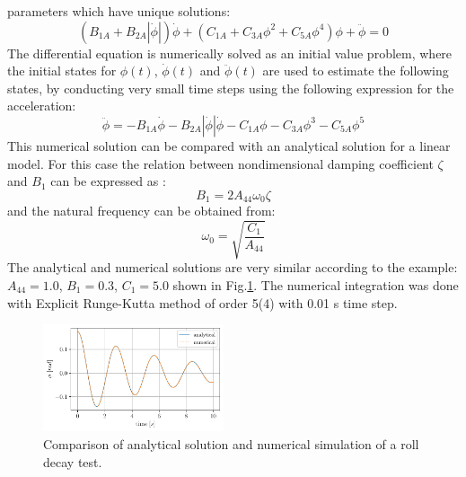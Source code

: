 parameters which have unique solutions:
\begin{equation}
\left(B_{1A} + B_{2A} \left|{\dot{\phi}}\right|\right) \dot{\phi} + \left(C_{1A} + C_{3A} \phi^{2} + C_{5A} \phi^{4}\right) \phi + \ddot{\phi} = 0
\label{eq:roll_decay_equation_quadratic_A}
\end{equation}
The differential equation is numerically solved as an initial value
problem, where the initial states for $\phi(t)$, $\dot{\phi}(t)$ and
$\ddot{\phi}(t)$ are used to estimate the following states, by
conducting very small time steps using the following expression for the
acceleration:
\begin{equation}
\ddot{\phi} = - B_{1A} \dot{\phi} - B_{2A} \left|{\dot{\phi}}\right| \dot{\phi} - C_{1A} \phi - C_{3A} \phi^{3} - C_{5A} \phi^{5}
\label{eq:eq_phi1d}
\end{equation}
This numerical solution can be compared with an analytical solution
\citep{7505983/KL7A3RIV} for a linear model.
For this
case the relation between nondimensional damping coefficient $\zeta$
and $B_1$ can be expressed as \citep{7505983/FB64RGPF}:
\begin{equation}
B_{1} = 2 A_{44} \omega_{0} \zeta
\label{eq:b_1_zeta_eq}
\end{equation}
and the natural frequency can be obtained from:
\begin{equation}
\omega_{0} = \sqrt{\frac{C_{1}}{A_{44}}}
\label{eq:omega0_eq}
\end{equation}
The analytical and numerical solutions are very similar according to the
example: $A_{44} = 1.0$, $B_1 = 0.3$, $C_1 = 5.0$ shown in
Fig.\ref{fig:analytical_numerical}. The numerical integration
was done with Explicit Runge-Kutta method of order 5(4) with 0.01 s time
step.
\begin{figure}[H]
\begin{center}\includegraphics[width = 0.475\textwidth]{figures/analytical_numerical.pdf}\end{center}
\vspace{-0.7cm}
\caption{Comparison of analytical solution and numerical simulation of a roll decay test.}
\label{fig:analytical_numerical}
\end{figure}
